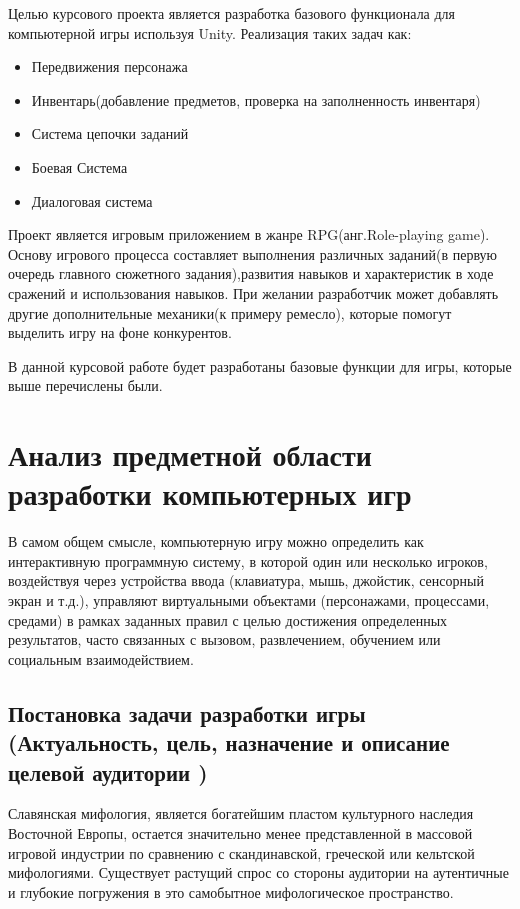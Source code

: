 \documentclass[bachelor, och, coursework, times]{SCWorks}
\begin{document}
    
    \intro
    Целью курсового проекта является разработка базового функционала 
    для компьютерной игры используя Unity. Реализация таких задач как:
    \begin{itemize}
     
\item  Передвижения персонажа
\item Инвентарь(добавление предметов, проверка на заполненность инвентаря)
\item Система цепочки заданий
\item Боевая Система
\item Диалоговая система
\end{itemize}

Проект является игровым приложением в жанре RPG(анг.Role-playing game).
Основу игрового процесса составляет выполнения различных заданий(в первую очередь
главного сюжетного задания),развития навыков и характеристик в ходе сражений
и использования навыков. При желании разработчик может добавлять другие 
дополнительные механики(к примеру ремесло), которые помогут выделить игру
на фоне конкурентов. 

В данной курсовой работе будет разработаны базовые функции для игры,
которые выше перечислены были.

\section{Анализ предметной области разработки компьютерных игр}

    В самом общем смысле, компьютерную игру можно определить как интерактивную программную систему,
     в которой один или несколько игроков, воздействуя через устройства ввода 
     (клавиатура, мышь, джойстик, сенсорный экран и т.д.), 
     управляют виртуальными объектами (персонажами, процессами, средами)
      в рамках заданных правил с целью достижения определенных результатов, 
      часто связанных с вызовом, развлечением, обучением или социальным взаимодействием.


    \subsection{Постановка задачи разработки игры 
    (Актуальность, цель, назначение и описание целевой аудитории )}

    Славянская мифология, является богатейшим пластом культурного наследия Восточной Европы, 
    остается значительно менее представленной в массовой игровой индустрии 
    по сравнению с скандинавской, греческой или кельтской мифологиями. 
    Существует растущий спрос со стороны аудитории 
    на аутентичные и глубокие погружения в это самобытное мифологическое пространство.
\end{document}
